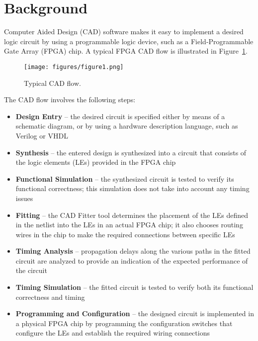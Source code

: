 \newpage


\section{Background}
Computer Aided Design (CAD) software makes it easy to implement a desired logic
circuit by using a programmable logic device, such as a Field-Programmable 
Gate Array (FPGA) chip. A typical FPGA CAD flow is illustrated in Figure~\ref{fig:1}. 

\begin{figure}[H]
   \begin{center}
      \texttt{[image: figures/figure1.png]}
   \caption{Typical CAD flow.} 
	 \label{fig:1}
	 \end{center}
\end{figure}

The CAD flow involves the following steps:
\begin{itemize}
\item {\bf Design Entry} -- the desired circuit is specified either by means of
a schematic diagram, or by using a hardware description language, 
such as Verilog or VHDL
\item {\bf Synthesis} -- the entered design is synthesized into a circuit
that consists of the logic elements (LEs) provided in the FPGA chip
\item {\bf Functional Simulation} -- the synthesized circuit is tested to
verify its functional correctness; this simulation does not take into account
any timing issues
\item {\bf Fitting} -- the CAD Fitter tool determines the placement of the LEs 
defined in the netlist into the LEs in an actual FPGA chip; it also 
chooses routing wires in the chip to make the required connections 
between specific LEs 
\item {\bf Timing Analysis} -- propagation delays along the various paths
in the fitted circuit are analyzed to provide an indication of the expected
performance of the circuit
\item {\bf Timing Simulation} -- the fitted circuit is tested to verify both
its functional correctness and timing
\item {\bf Programming and Configuration} -- the designed circuit is implemented
in a physical FPGA chip by programming the configuration switches that configure
the LEs and establish the required wiring connections
\end{itemize}

